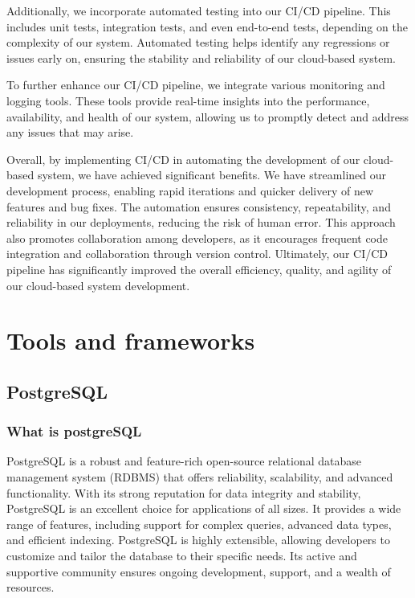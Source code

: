 \documentclass[
12pt,
oneside, 
onehalfspacing, 
nolistspacing, 
parskip, 
chapterinoneline, 
]{AASTCOMPUTER}
\begin{document}
Additionally, we incorporate automated testing into our CI/CD pipeline. This includes unit tests, integration tests, and even end-to-end tests, depending on the complexity of our system. Automated testing helps identify any regressions or issues early on, ensuring the stability and reliability of our cloud-based system.

To further enhance our CI/CD pipeline, we integrate various monitoring and logging tools. These tools provide real-time insights into the performance, availability, and health of our system, allowing us to promptly detect and address any issues that may arise.

Overall, by implementing CI/CD in automating the development of our cloud-based system, we have achieved significant benefits. We have streamlined our development process, enabling rapid iterations and quicker delivery of new features and bug fixes. The automation ensures consistency, repeatability, and reliability in our deployments, reducing the risk of human error. This approach also promotes collaboration among developers, as it encourages frequent code integration and collaboration through version control. Ultimately, our CI/CD pipeline has significantly improved the overall efficiency, quality, and agility of our cloud-based system development.

\section{Tools and frameworks}

\subsection{PostgreSQL}

\subsubsection{What is postgreSQL}

PostgreSQL \cite{momjian2001postgresql} is a robust and feature-rich open-source relational database management system (RDBMS) that offers reliability, scalability, and advanced functionality. With its strong reputation for data integrity and stability, PostgreSQL is an excellent choice for applications of all sizes. It provides a wide range of features, including support for complex queries, advanced data types, and efficient indexing. PostgreSQL is highly extensible, allowing developers to customize and tailor the database to their specific needs. Its active and supportive community ensures ongoing development, support, and a wealth of resources.
\end{document}
